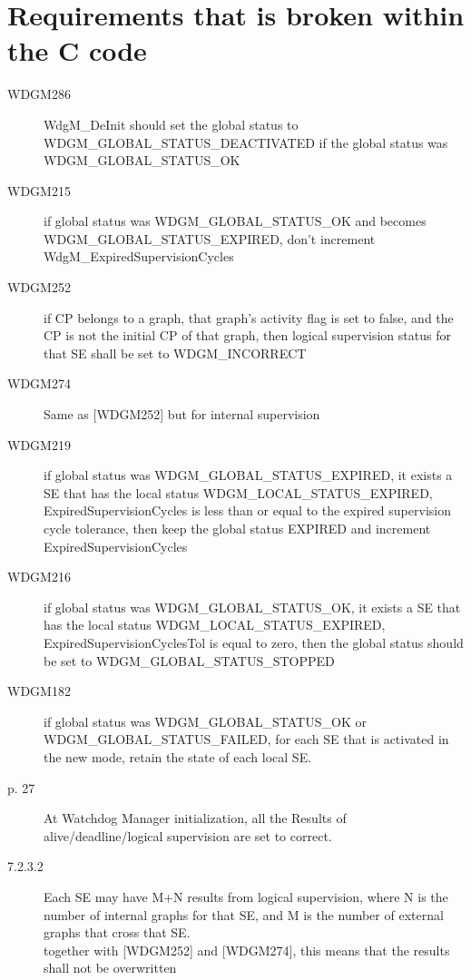 \documentclass[11pt,a4paper]{article}
\begin{document}
\section{Requirements that is broken within the C code}
\begin{description}
  \item[WDGM286] \parbox[t]{0.8\linewidth}{WdgM\_DeInit should set the global
      status to WDGM\_GLOBAL\_STATUS\_DEACTIVATED if the global status was
    WDGM\_GLOBAL\_STATUS\_OK}
  \item[WDGM215] \parbox[t]{0.8\linewidth}{if global status was
      WDGM\_GLOBAL\_STATUS\_OK and becomes WDGM\_GLOBAL\_STATUS\_EXPIRED, don't
      increment WdgM\_ExpiredSupervisionCycles}
  \item[WDGM252] \parbox[t]{0.8\linewidth}{if CP belongs to a graph, that
      graph's activity flag is set to false, and the CP is not the initial CP of
      that graph, then logical supervision status for that SE shall be set to
      WDGM\_INCORRECT}
  \item[WDGM274] \parbox[t]{0.8\linewidth}{Same as [WDGM252] but for internal
      supervision}
  \item[WDGM219] \parbox[t]{0.8\linewidth}{if global status was
      WDGM\_GLOBAL\_STATUS\_EXPIRED, it exists a SE that has the local status
      WDGM\_LOCAL\_STATUS\_EXPIRED, ExpiredSupervisionCycles is less than or
      equal to the expired supervision cycle tolerance, then keep the global
      status EXPIRED and increment ExpiredSupervisionCycles}
  \item[WDGM216] \parbox[t]{0.8\linewidth}{if global status was
      WDGM\_GLOBAL\_STATUS\_OK, it exists a SE that has the local status
      WDGM\_LOCAL\_STATUS\_EXPIRED, ExpiredSupervisionCyclesTol is equal to
      zero, then the global status should be set to
      WDGM\_GLOBAL\_STATUS\_STOPPED}
  \item[WDGM182] \parbox[t]{0.8\linewidth}{if global status was WDGM\_GLOBAL\_STATUS\_OK or
      WDGM\_GLOBAL\_STATUS\_FAILED, for each SE that is activated in the new mode,
      retain the state of each local SE.}
  \item[p. 27] \parbox[t]{0.8\linewidth}{At Watchdog Manager initialization, all
      the Results of alive/deadline/logical supervision are set to correct.}
  \item[7.2.3.2] \parbox[t]{0.8\linewidth}{Each SE may have M+N results from
      logical supervision, where N is the number of internal graphs for that SE,
      and M is the number of external graphs that cross that SE.\\

      together with [WDGM252] and [WDGM274], this means that the results shall not
      be overwritten}
\end{description}
\end{document}
